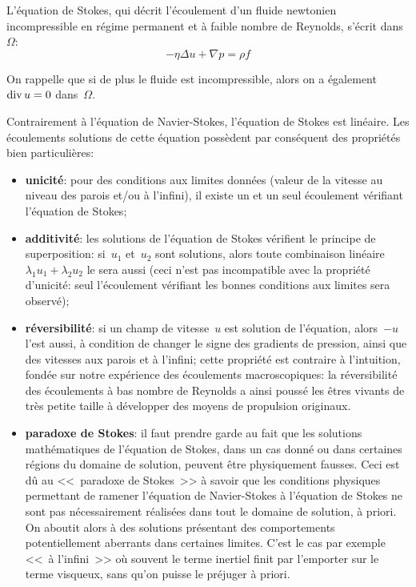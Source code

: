 \medskip
L'équation de Stokes, qui décrit l'écoulement d'un fluide newtonien incompressible en régime 
permanent et à faible nombre de Reynolds, 
s'écrit dans~$\Omega$:
\begin{equation}
-\eta \Delta u + \nabla p = \rho f
\end{equation}

On rappelle que si de plus le fluide est incompressible, alors on a également 
$\operatorname{div} u = 0$ dans~$\Omega$.


\medskip
Contrairement à l'équation de Navier-Stokes, l'équation de Stokes est linéaire.
Les écoulements solutions de cette équation possèdent par conséquent des propriétés bien particulières:
\begin{itemize}
  \item \textbf{unicité}: 
	pour des conditions aux limites données (valeur de la vitesse au niveau des parois et/ou à l'infini), 
	il existe un et un seul écoulement vérifiant l'équation de Stokes;
  \item \textbf{additivité}: 
	les solutions de l'équation de Stokes vérifient le principe de superposition: 
	si~$u_1$ et~$u_2$ sont solutions, alors toute combinaison linéaire~$\lambda_1 u_1 
	+ \lambda_2 u_2$ le sera aussi (ceci n'est pas incompatible avec la propriété d'unicité: seul 
	l'écoulement vérifiant les bonnes conditions aux limites sera observé);
  \item \textbf{réversibilité}: 
	si un champ de vitesse~$u$ est solution de l'équation, alors~$-u$ 
	l'est aussi, à condition de changer le signe des gradients de pression, ainsi que des vitesses aux 
	parois et à l'infini; cette propriété est contraire à l'intuition, fondée sur notre expérience 
	des écoulements macroscopiques: la réversibilité des écoulements à bas nombre de Reynolds 
	a ainsi poussé les êtres vivants de très petite taille à développer des moyens de propulsion originaux.
  \item \textbf{paradoxe de Stokes}: 
	il faut prendre garde au fait que les solutions mathématiques de l'équation de Stokes, 
	dans un cas donné ou dans certaines régions du domaine de solution, peuvent être 
	physiquement fausses. Ceci est dû au <<~paradoxe de Stokes~>> à savoir que les 
	conditions physiques permettant de ramener l'équation de Navier-Stokes à l'équation 
	de Stokes ne sont pas nécessairement réalisées dans tout le domaine de solution, à priori. 
	On aboutit alors à des solutions présentant des comportements potentiellement aberrants 
	dans certaines limites. C'est le cas par exemple <<~à l'infini~>> où souvent le terme inertiel 
	finit par l'emporter sur le terme visqueux, sans qu'on puisse le préjuger à priori.
\end{itemize}




